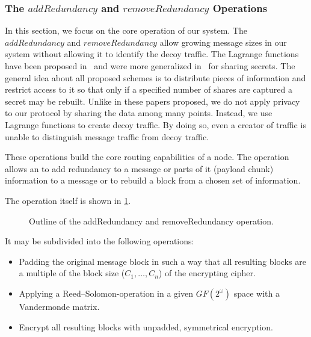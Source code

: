 \subsubsection{The \texorpdfstring{$addRedundancy$}{addRedundancy} and \texorpdfstring{$removeRedundancy$}{removeRedundancy} Operations}\label{sec:redundancyOperation}
In this section, we focus on the core operation of our system. The $addRedundancy$ and $removeRedundancy$ allow growing message sizes in our system without allowing it to identify the decoy traffic. 
The Lagrange functions have been proposed in~\cite{shamir1979share} and were more generalized in~\cite{mceliece1981sharing} for sharing secrets. The general idea about all proposed schemes is to distribute pieces of information and restrict access to it so that only if a specified number of shares are captured a secret may be rebuilt. Unlike in these papers proposed, we do not apply privacy to our protocol by sharing the data among many points. Instead, we use Lagrange functions to create decoy traffic. By doing so, even a creator of traffic is unable to distinguish message traffic from decoy traffic. 

These operations build the core routing capabilities of a node. The operation allows an  to add redundancy to a message or parts of it (payload chunk) information to a message or to rebuild a block from a chosen set of information.  

The operation itself is shown in \cref{fig:addRedundancyOperation}. 

\begin{figure}[ht]\centering
	\resizebox{0.49\textwidth}{!}{}
	\resizebox{0.49\textwidth}{!}{}
	\caption{Outline of the addRedundancy and removeRedundancy operation.}
	\label{fig:addRedundancyOperation}
\end{figure}

It may be subdivided into the following operations:
\begin{itemize}
	\item Padding the original message block in such a way that all resulting blocks are a multiple of the block size ($C_1,\ldots, C_n$) of the encrypting cipher.
	\item Applying a Reed--Solomon-operation in a given $GF(2^\omega)$ space with a Vandermonde matrix.
	\item Encrypt all resulting blocks with unpadded, symmetrical encryption.
\end{itemize}

